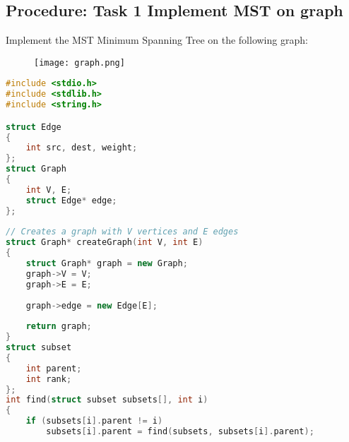\documentclass[11pt]{article}            %
\begin{document}
\subsection{Procedure: Task 1 Implement MST on graph}
Implement the MST Minimum Spanning Tree on the following graph:
\begin{figure}[H]
\centering
  \texttt{[image: graph.png]}    
\end{figure}
\begin{lstlisting}[language=C++]
#include <stdio.h>
#include <stdlib.h>
#include <string.h>

struct Edge
{
    int src, dest, weight;
};
struct Graph
{
    int V, E;
    struct Edge* edge;
};
 
// Creates a graph with V vertices and E edges
struct Graph* createGraph(int V, int E)
{
    struct Graph* graph = new Graph;
    graph->V = V;
    graph->E = E;
 
    graph->edge = new Edge[E];
 
    return graph;
}
struct subset
{
    int parent;
    int rank;
};
int find(struct subset subsets[], int i)
{
    if (subsets[i].parent != i)
        subsets[i].parent = find(subsets, subsets[i].parent);
 

\end{lstlisting}
\end{document}
